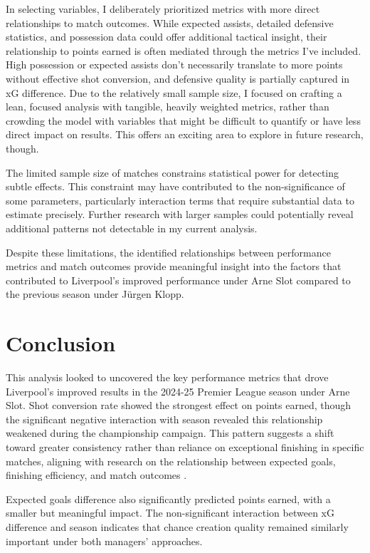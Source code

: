\documentclass[12pt]{article}
\begin{document}
In selecting variables, I deliberately prioritized metrics with more direct relationships to match outcomes. While expected assists, detailed defensive statistics, and possession data could offer additional tactical insight, their relationship to points earned is often mediated through the metrics I've included. High possession or expected assists don't necessarily translate to more points without effective shot conversion, and defensive quality is partially captured in xG difference. Due to the relatively small sample size, I focused on crafting a lean, focused analysis with tangible, heavily weighted metrics, rather than crowding the model with variables that might be difficult to quantify or have less direct impact on results. This offers an exciting area to explore in future research, though.

The limited sample size of matches constrains statistical power for detecting subtle effects. This constraint may have contributed to the non-significance of some parameters, particularly interaction terms that require substantial data to estimate precisely. Further research with larger samples could potentially reveal additional patterns not detectable in my current analysis.

Despite these limitations, the identified relationships between performance metrics and match outcomes provide meaningful insight into the factors that contributed to Liverpool's improved performance under Arne Slot compared to the previous season under Jürgen Klopp.

\section*{Conclusion}

This analysis looked to uncovered the key performance metrics that drove Liverpool's improved results in the 2024-25 Premier League season under Arne Slot. Shot conversion rate showed the strongest effect on points earned, though the significant negative interaction with season revealed this relationship weakened during the championship campaign. This pattern suggests a shift toward greater consistency rather than reliance on exceptional finishing in specific matches, aligning with research on the relationship between expected goals, finishing efficiency, and match outcomes \citep{anzer2023}.

Expected goals difference also significantly predicted points earned, with a smaller but meaningful impact. The non-significant interaction between xG difference and season indicates that chance creation quality remained similarly important under both managers' approaches.
\end{document}
